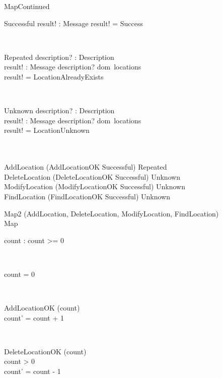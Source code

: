 \documentclass[12pt]{article}
\begin{document}
\begin{spacing}{1.5}
\begin{class}{MapContinued}
\begin{op}{Successful}
result! : Message
\ST
result! = Success
\end{op}\\
\begin{op}{Repeated}
description? : Description\\
result! : Message
\ST
description? \in dom~locations\\
result! = LocationAlreadyExists
\end{op}\\
\begin{op}{Unknown}
description? : Description\\
result! : Message
\ST
description? \notin dom~locations\\
result! = LocationUnknown
\end{op}\\
\\
AddLocation \triangleq (AddLocationOK \wedge Successful) \vee Repeated\\
DeleteLocation \triangleq (DeleteLocationOK \wedge Successful) \vee Unknown\\
ModifyLocation \triangleq (ModifyLocationOK \wedge Successful) \vee Unknown\\
FindLocation \triangleq (FindLocationOK \wedge Successful) \vee Unknown\\
\end{class}

\begin{class}{Map2}
\also
\upharpoonright (AddLocation, DeleteLocation, ModifyLocation, FindLocation) \\
Map\\
\begin{state}
count : 
\where
count >= 0
\end{state} \\
\begin{init}
count = 0
\end{init} \\
\begin{op}{AddLocationOK}
\Delta (count) \\
\ST
count' = count + 1
\end{op}\\
\begin{op}{DeleteLocationOK}
\Delta (count) \\
\ST
count > 0\\
count' = count - 1
\end{op}\\
\end{class}




\end{spacing}
\end{document}
